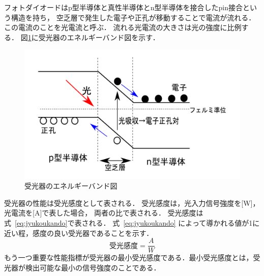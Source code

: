 フォトダイオードはp型半導体と真性半導体とn型半導体を接合したpin接合という構造を持ち，
空乏層で発生した電子や正孔が移動することで電流が流れる．
この電流のことを光電流と呼ぶ．
流れる光電流の大きさは光の強度に比例する．
図\ref{fig:photo}に受光器のエネルギーバンド図を示す．
\begin{figure}[t!]
\begin{center}
\includegraphics[keepaspectratio,scale=0.4]{fig/3/photodiode.pdf}
\caption{受光器のエネルギーバンド図}
\label{fig:photo}
\end{center}
\end{figure}

受光器の性能は受光感度として表される．
受光感度は，光入力信号強度を[W]，光電流を[A]で表した場合，
両者の比で表される．
受光感度は式~\eqref{eq:jyukoukando}で表される．
式~\eqref{eq:jyukoukando} によって導かれる値が1に近い程，感度の良い受光器であることを示す．
\begin{equation}
受光感度 = \frac{A}{W}
\label{eq:jyukoukando}
\end{equation}
もう一つ重要な性能指標が受光器の最小受光感度である．最小受光感度とは，受光器が検出可能な最小の信号強度のことである．

